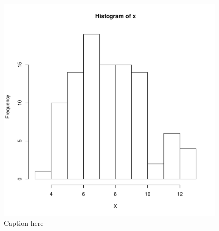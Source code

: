 \documentclass[11pt]{article}  %
\begin{document}
\begin{figure}[tb]
    \begin{center}
        \includegraphics{binomial_sample.pdf}
    \end{center}
    \caption{Caption here}
    \label{fig:figure1}
\end{figure}
\end{document}
